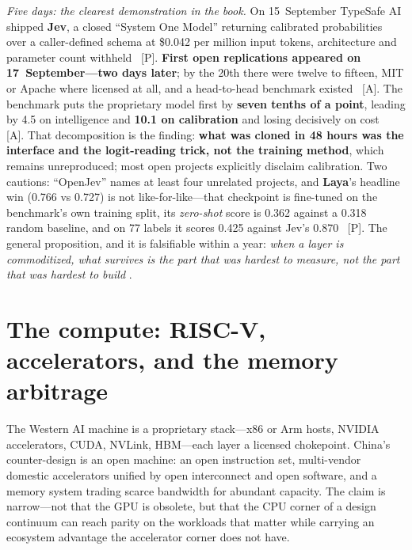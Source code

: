 \emph{Five days: the clearest demonstration in the book.} On 15~September TypeSafe AI shipped \textbf{Jev}, a closed ``System One Model'' returning calibrated probabilities over a caller-defined schema at \$0.042 per million input tokens, architecture and parameter count withheld~\cite{jev} [P]. \textbf{First open replications appeared on 17~September---two days later}; by the 20th there were twelve to fifteen, MIT or Apache where licensed at all, and a head-to-head benchmark existed~\cite{jev-replications} [A]. The benchmark puts the proprietary model first by \textbf{seven tenths of a point}, leading by 4.5 on intelligence and \textbf{10.1 on calibration} and losing decisively on cost~\cite{jevbench} [A]. That decomposition is the finding: \textbf{what was cloned in 48 hours was the interface and the logit-reading trick, not the training method}, which remains unreproduced; most open projects explicitly disclaim calibration. Two cautions: ``OpenJev'' names at least four unrelated projects, and \textbf{Laya}'s headline win (0.766 vs 0.727) is not like-for-like---that checkpoint is fine-tuned on the benchmark's own training split, its \emph{zero-shot} score is 0.362 against a 0.318 random baseline, and on 77 labels it scores 0.425 against Jev's 0.870~\cite{laya} [P]. The general proposition, and it is falsifiable within a year: \emph{when a layer is commoditized, what survives is the part that was hardest to measure, not the part that was hardest to build} .

\section{The compute: RISC-V, accelerators, and the memory arbitrage}
\label{c:compute}

The Western AI machine is a proprietary stack---x86 or Arm hosts, NVIDIA accelerators, CUDA, NVLink, HBM---each layer a licensed chokepoint. China's counter-design is an open machine: an open instruction set, multi-vendor domestic accelerators unified by open interconnect and open software, and a memory system trading scarce bandwidth for abundant capacity. The claim is narrow---not that the GPU is obsolete, but that the CPU corner of a design continuum can reach parity on the workloads that matter while carrying an ecosystem advantage the accelerator corner does not have.

